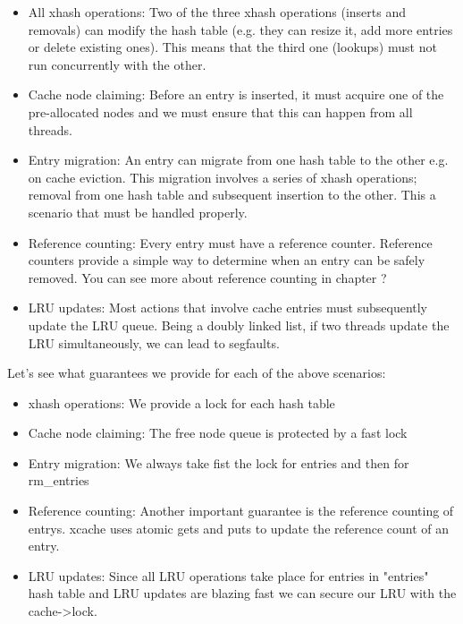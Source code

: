 \begin{itemize}
	\item
		All xhash operations: Two of the three xhash operations (inserts 
		and removals) can modify the hash table (e.g. they can resize 
		it, add more entries or delete existing ones).  This means that 
		the third one (lookups) must not run concurrently with the 
		other.
	\item
		Cache node claiming: Before an entry is inserted, it must	
		acquire one of the pre-allocated nodes and we must ensure that 
		this can happen from all threads.
	\item
		Entry migration: An entry can migrate from one hash table to 
		the other e.g. on cache eviction. This migration involves a 
		series of xhash operations; removal from one hash table and 
		subsequent insertion to the other. This a scenario that must be 
		handled properly.
	\item
		Reference counting: Every entry must have a reference counter.  
		Reference counters provide a simple way to determine when an 
		entry can be safely removed. You can see more about reference 
		counting in chapter ?
	\item
		LRU updates: Most actions that involve cache entries must 
		subsequently update the LRU queue. Being a doubly linked list, 
		if two threads update the LRU simultaneously, we can lead to 
		segfaults.
\end{itemize}

Let's see what guarantees we provide for each of the above scenarios:

\begin{itemize}
	\item
		xhash operations: We provide a lock for each hash table
	\item
		Cache node claiming: The free node queue is protected by a fast 
		lock
	\item
		Entry migration: We always take fist the lock for entries and 
		then for rm\_entries
	\item
		Reference counting: Another important guarantee is the 
		reference counting of entrys. xcache uses atomic gets and puts 
		to update the reference count of an entry.
	\item
		LRU updates: Since all LRU operations take place for entries in 
		"entries" hash table and LRU updates are blazing fast we can 
		secure our LRU with the cache->lock.
\end{itemize}


